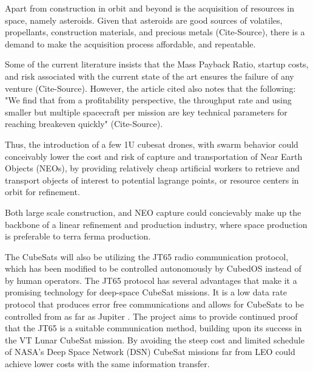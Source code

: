 Apart from construction in orbit and beyond is the acquisition of
resources in space, namely asteroids. Given that asteroids are good
sources of volatiles, propellants, construction materials, and
precious metals (Cite-Source), there is a demand to make the
acquisition process affordable, and repeatable.

Some of the current literature insists that the Mass Payback Ratio,
startup costs, and risk associated with the current state of the art
ensures the failure of any venture (Cite-Source). However, the article
cited also notes that the following: "We find that from a
profitability perspective, the throughput rate and using smaller but
multiple spacecraft per mission are key technical parameters for
reaching breakeven quickly" (Cite-Source).

Thus, the introduction of a few 1U cubesat drones, with swarm behavior
could conceivably lower the cost and risk of capture and
transportation of Near Earth Objects (NEOs), by providing relatively
cheap artificial workers to retrieve and transport objects of interest
to potential lagrange points, or resource centers in orbit for
refinement.

Both large scale construction, and NEO capture could concievably make
up the backbone of a linear refinement and production industry, where
space production is preferable to terra ferma production.

The CubeSats will also be utilizing the JT65 radio communication
protocol, which has been modified to be controlled autonomously by
CubedOS instead of by human operators. The JT65 protocol has several
advantages that make it a promising technology for deep-space CubeSat
missions. It is a low data rate protocol that produces error free
communications and allows for CubeSats to be controlled from as far as
Jupiter \cite{brandon:2019}. The project aims to provide continued
proof that the JT65 is a suitable communication method, building upon
its success in the VT Lunar CubeSat mission. By avoiding the steep
cost and limited schedule of NASA’s Deep Space Network (DSN) CubeSat
missions far from LEO could achieve lower costs with the same
information transfer.
